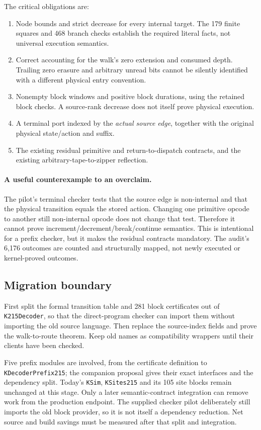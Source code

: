\documentclass[11pt]{article}
\begin{document}
The critical obligations are:
\begin{enumerate}
\item Node bounds and strict decrease for every internal target. The 179 finite squares and 468 branch checks establish the required literal facts, not universal execution semantics.
\item Correct accounting for the walk's zero extension and consumed depth. Trailing zero erasure and arbitrary unread bits cannot be silently identified with a different physical entry convention.
\item Nonempty block windows and positive block durations, using the retained block checks. A source-rank decrease does not itself prove physical execution.
\item A terminal port indexed by the \emph{actual source edge}, together with the original physical state/action and suffix.
\item The existing residual primitive and return-to-dispatch contracts, and the existing arbitrary-tape-to-zipper reflection.
\end{enumerate}

\paragraph{A useful counterexample to an overclaim.}
The pilot's terminal checker tests that the source edge is non-internal and that the physical transition equals the stored action. Changing one primitive opcode to another still non-internal opcode does not change that test. Therefore it cannot prove increment/decrement/break/continue semantics. This is intentional for a prefix checker, but it makes the residual contracts mandatory. The audit's 6,176 outcomes are counted and structurally mapped, not newly executed or kernel-proved outcomes.

\subsection{Migration boundary}
First split the formal transition table and 281 block certificates out of \texttt{K215Decoder}, so that the direct-program checker can import them without importing the old source language. Then replace the source-index fields and prove the walk-to-route theorem. Keep old names as compatibility wrappers until their clients have been checked.

Five prefix modules are involved, from the certificate definition to \texttt{KDecoderPrefix215}; the companion proposal gives their exact interfaces and the dependency split. Today's \texttt{KSim}, \texttt{KSites215} and its 105 site blocks remain unchanged at this stage. Only a later semantic-contract integration can remove work from the production endpoint. The supplied checker pilot deliberately still imports the old block provider, so it is not itself a dependency reduction. Net source and build savings must be measured after that split and integration.
\end{document}
